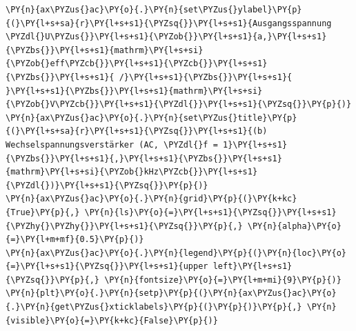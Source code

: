 \begin{tcolorbox}[breakable, size=fbox, boxrule=1pt, pad at break*=1mm,colback=cellbackground, colframe=cellborder]
\begin{Verbatim}[commandchars=\\\{\}]
\PY{n}{ax\PYZus{}ac}\PY{o}{.}\PY{n}{set\PYZus{}ylabel}\PY{p}{(}\PY{l+s+sa}{r}\PY{l+s+s1}{\PYZsq{}}\PY{l+s+s1}{Ausgangsspannung \PYZdl{}U\PYZus{}}\PY{l+s+s1}{\PYZob{}}\PY{l+s+s1}{a,}\PY{l+s+s1}{\PYZbs{}}\PY{l+s+s1}{mathrm}\PY{l+s+si}{\PYZob{}eff\PYZcb{}}\PY{l+s+s1}{\PYZcb{}}\PY{l+s+s1}{\PYZbs{}}\PY{l+s+s1}{ /}\PY{l+s+s1}{\PYZbs{}}\PY{l+s+s1}{ }\PY{l+s+s1}{\PYZbs{}}\PY{l+s+s1}{mathrm}\PY{l+s+si}{\PYZob{}V\PYZcb{}}\PY{l+s+s1}{\PYZdl{}}\PY{l+s+s1}{\PYZsq{}}\PY{p}{)}
\PY{n}{ax\PYZus{}ac}\PY{o}{.}\PY{n}{set\PYZus{}title}\PY{p}{(}\PY{l+s+sa}{r}\PY{l+s+s1}{\PYZsq{}}\PY{l+s+s1}{(b) Wechselspannungsverstärker (AC, \PYZdl{}f = 1}\PY{l+s+s1}{\PYZbs{}}\PY{l+s+s1}{,}\PY{l+s+s1}{\PYZbs{}}\PY{l+s+s1}{mathrm}\PY{l+s+si}{\PYZob{}kHz\PYZcb{}}\PY{l+s+s1}{\PYZdl{})}\PY{l+s+s1}{\PYZsq{}}\PY{p}{)}
\PY{n}{ax\PYZus{}ac}\PY{o}{.}\PY{n}{grid}\PY{p}{(}\PY{k+kc}{True}\PY{p}{,} \PY{n}{ls}\PY{o}{=}\PY{l+s+s1}{\PYZsq{}}\PY{l+s+s1}{\PYZhy{}\PYZhy{}}\PY{l+s+s1}{\PYZsq{}}\PY{p}{,} \PY{n}{alpha}\PY{o}{=}\PY{l+m+mf}{0.5}\PY{p}{)}
\PY{n}{ax\PYZus{}ac}\PY{o}{.}\PY{n}{legend}\PY{p}{(}\PY{n}{loc}\PY{o}{=}\PY{l+s+s1}{\PYZsq{}}\PY{l+s+s1}{upper left}\PY{l+s+s1}{\PYZsq{}}\PY{p}{,} \PY{n}{fontsize}\PY{o}{=}\PY{l+m+mi}{9}\PY{p}{)}
\PY{n}{plt}\PY{o}{.}\PY{n}{setp}\PY{p}{(}\PY{n}{ax\PYZus{}ac}\PY{o}{.}\PY{n}{get\PYZus{}xticklabels}\PY{p}{(}\PY{p}{)}\PY{p}{,} \PY{n}{visible}\PY{o}{=}\PY{k+kc}{False}\PY{p}{)}


\end{Verbatim}
\end{tcolorbox}
